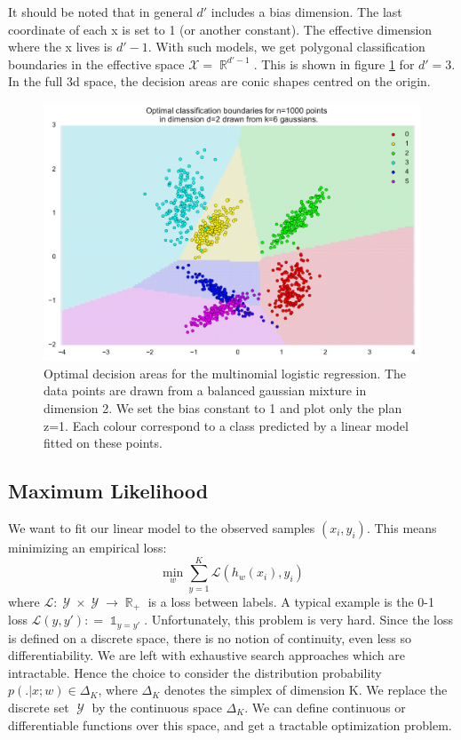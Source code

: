 \documentclass{article}
\DeclareMathOperator{\R}{\mathbb{R}}
\DeclareMathOperator{\1}{\mathbb{1}}
\DeclareMathOperator{\Y}{\mathcal{Y}}
\begin{document}
It should be noted that in general $d'$ includes a bias dimension.
The last coordinate of each x is set to 1 (or another constant).
The effective dimension where the x lives is $d'-1$.
With such models, we get polygonal classification boundaries in the effective space $\mathcal X = \R^{d'-1}$.
This is shown in figure \ref{linear classification} for $d'=3$.
In the full 3d space, the decision areas are conic shapes centred on the origin.

\begin{figure}[ht]
	\label{linear classification}
	\includegraphics[width=\textwidth]{images/linear_classification.pdf}
	\caption{
	Optimal decision areas for the multinomial logistic regression.
	The data points are drawn from a balanced gaussian mixture in dimension 2.
	We set the bias constant to 1 and plot only the plan z=1.
	Each colour correspond to a class predicted by a linear model fitted on these points. 
	}
\end{figure}



 \subsection{Maximum Likelihood}

We want to fit our linear model to the observed samples $(x_i, y_i)$.
This means minimizing an empirical loss:
\begin{equation}
	\min_w \sum_{y=1}^K \mathcal L (h_w(x_i),y_i)
\end{equation}
where $\mathcal L: \Y \times \Y \rightarrow \R_+$ is a loss between labels.
A typical example is the 0-1 loss $\mathcal L(y, y') : = \1_{y=y'}$.
Unfortunately, this problem is very hard.
Since the loss is defined on a discrete space, there is no notion of continuity, even less so differentiability.
We are left with exhaustive search approaches which are intractable.
Hence the choice to consider the distribution probability $p( . | x ; w) \in \Delta_K$, where $\Delta_K$ denotes the simplex of dimension K.
We replace the discrete set $\Y$ by the continuous space $\Delta_K$.
We can define continuous or differentiable functions over this space, and get a tractable optimization problem.
 
\end{document}
